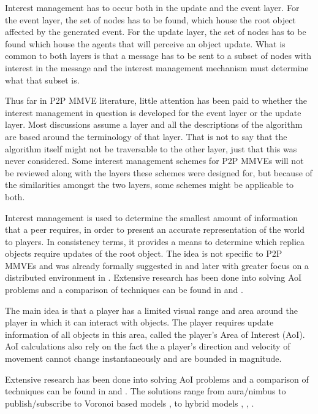 Interest management has to occur both in the update and the event layer. For the event layer, the set of nodes has to be found, which house the root object affected by the generated event. For the update layer, the set of nodes has to be found which house the agents that will perceive an object update. What is common to both layers is that a message has to be sent to a subset of nodes with interest in the message and the interest management mechanism must determine what that subset is.

Thus far in P2P MMVE literature, little attention has been paid to whether the interest management in question is developed for the event layer or the update layer. Most discussions assume a layer and all the descriptions of the algorithm are based around the terminology of that layer. That is not to say that the algorithm itself might not be traversable to the other layer, just that this was never considered. Some interest management schemes for P2P MMVEs will not be reviewed along with the layers these schemes were designed for, but because of the similarities amongst the two layers, some schemes might be applicable to both.

Interest management is used to determine the smallest amount of information that a peer requires, in order to present an accurate representation of
the world to players. In consistency terms, it provides a means to determine which replica objects require updates of the root object. The idea is
not specific to P2P MMVEs and was already formally suggested in \cite{First_IM} and later with greater focus on a distributed environment in \cite{Whang_agent_based_IM}. Extensive research has been done into solving AoI problems and a comparison of techniques can be found in
\cite{Boulanger_IM_compare} and \cite{IM_and_ED_survey_Krause}.

The main idea is that a player has a limited visual range and area around the player in which it can interact with objects. The player requires
update information of all objects in this area, called the player's Area of Interest (AoI). AoI calculations also rely on the fact the a player's
direction and velocity of movement cannot change instantaneously and are bounded in magnitude.

Extensive research has been done into solving AoI problems and a comparison of techniques can be found in \cite{Boulanger_IM_compare} and
\cite{IM_and_ED_survey_Krause}. The solutions range from aura/nimbus \cite{Benford_spatial_IM} to publish/subscribe  \cite{mercury_publish_subscribe} to Voronoi based models \cite{Hu_voronoi_IM},  \cite{Buyukkaya_voronoi_state_management} to hybrid models \cite{hybrid_IM}, \cite{MOPAR}, \cite{fan_mediator_paper}.

